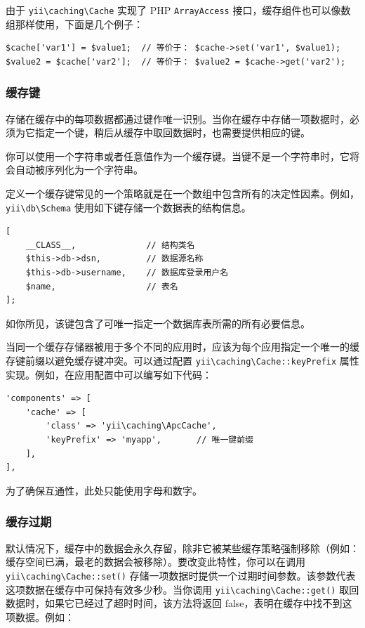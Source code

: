 由于 \texttt{yii{\allowbreak{}\textbackslash}caching{\allowbreak{}\textbackslash}Cache} 实现了 PHP \lstinline|ArrayAccess| 接口，缓存组件也可以像数组那样使用，下面是几个例子：

\lstset{language=php}\begin{lstlisting}
$cache['var1'] = $value1;  // 等价于： $cache->set('var1', $value1);
$value2 = $cache['var2'];  // 等价于： $value2 = $cache->get('var2');
\end{lstlisting}
\subsubsection{缓存键 \label{caching-data.md::cache-keys}}
存储在缓存中的每项数据都通过键作唯一识别。当你在缓存中存储一项数据时，必须为它指定一个键，稍后从缓存中取回数据时，也需要提供相应的键。

你可以使用一个字符串或者任意值作为一个缓存键。当键不是一个字符串时，它将会自动被序列化为一个字符串。

定义一个缓存键常见的一个策略就是在一个数组中包含所有的决定性因素。例如，\texttt{yii{\allowbreak{}\textbackslash}db{\allowbreak{}\textbackslash}Schema} 使用如下键存储一个数据表的结构信息。

\lstset{language=php}\begin{lstlisting}
[
    __CLASS__,              // 结构类名
    $this->db->dsn,         // 数据源名称
    $this->db->username,    // 数据库登录用户名
    $name,                  // 表名
];
\end{lstlisting}
如你所见，该键包含了可唯一指定一个数据库表所需的所有必要信息。

当同一个缓存存储器被用于多个不同的应用时，应该为每个应用指定一个唯一的缓存键前缀以避免缓存键冲突。可以通过配置 \texttt{yii{\allowbreak{}\textbackslash}caching{\allowbreak{}\textbackslash}Cache\allowbreak{}::\allowbreak{}keyPrefix} 属性实现。例如，在应用配置中可以编写如下代码：

\lstset{language=php}\begin{lstlisting}
'components' => [
    'cache' => [
        'class' => 'yii\caching\ApcCache',
        'keyPrefix' => 'myapp',       // 唯一键前缀
    ],
],
\end{lstlisting}
为了确保互通性，此处只能使用字母和数字。

\subsubsection{缓存过期 \label{caching-data.md::cache-expiration}}
默认情况下，缓存中的数据会永久存留，除非它被某些缓存策略强制移除（例如：缓存空间已满，最老的数据会被移除）。要改变此特性，你可以在调用 \texttt{yii{\allowbreak{}\textbackslash}caching{\allowbreak{}\textbackslash}Cache\allowbreak{}::\allowbreak{}set()} 存储一项数据时提供一个过期时间参数。该参数代表这项数据在缓存中可保持有效多少秒。当你调用 \texttt{yii{\allowbreak{}\textbackslash}caching{\allowbreak{}\textbackslash}Cache\allowbreak{}::\allowbreak{}get()} 取回数据时，如果它已经过了超时时间，该方法将返回 false，表明在缓存中找不到这项数据。例如：

